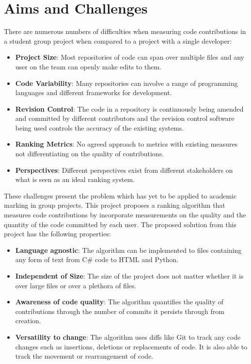 \documentclass[11pt]{informatics-report}
\begin{document}
\section{Aims and Challenges}
There are numerous numbers of difficulties when measuring code contributions in a student group project when compared to a project with a single developer:
\begin{itemize}
    \item \textbf{Project Size}: Most repositories of code can span over multiple files and any user on the team can openly make edits to them. 
    \item \textbf{Code Variability}: Many repositories can involve a range of programming languages and different frameworks for development.
    \item \textbf{Revision Control}: The code in a repository is continuously being amended and committed by different contributors and the revision control software being used controls the accuracy of the existing systems.
    \item \textbf{Ranking Metrics}: No agreed approach to metrics with existing measures not differentiating on the quality of contributions.
    \item \textbf{Perspectives}: Different perspectives exist from different stakeholders on what is seen as an ideal ranking system.
\end{itemize}

These challenges present the problem which has yet to be applied to academic marking in group projects. This project proposes a ranking algorithm that measures code contributions by incorporate measurements on the quality and the quantity of the code committed by each user. The proposed solution from this project has the following properties:
\begin{itemize}
    \item \textbf{Language agnostic}: The algorithm can be implemented to files containing any form of text from C# code to HTML and Python. 
    \item \textbf{Independent of Size}: The size of the project does not matter whether it is over large files or over a plethora of files.
    \item \textbf{Awareness of code quality}: The algorithm quantifies the quality of contributions through the number of commits it persists through from creation.
    \item \textbf{Versatility to change}: The algorithm uses diffs like Git to track any code changes such as insertions, deletions or replacements of code. It is also able to track the movement or rearrangement of code.

\end{itemize}
\end{document}
